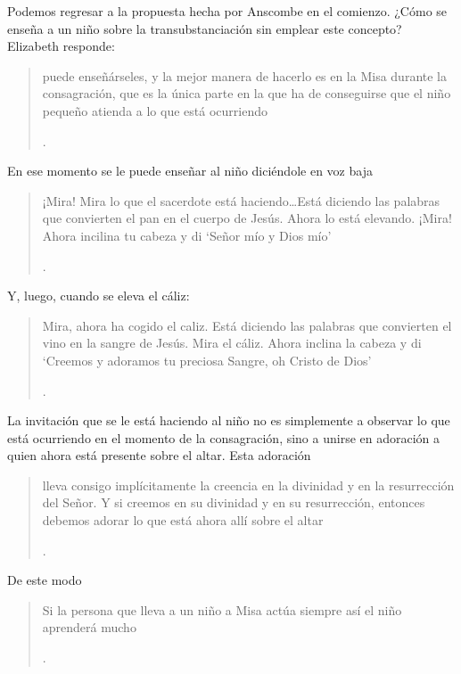 Podemos regresar a la propuesta hecha por Anscombe en el comienzo. ¿Cómo se enseña a un niño sobre la transubstanciación sin emplear este concepto? Elizabeth responde: \blockquote[{\Cite[85]{torralbaynubiola2005fayeh:ot}}.
]{puede enseñárseles, y la mejor manera de hacerlo es en la Misa durante la consagración, que es la única parte en la que ha de conseguirse que el niño pequeño atienda a lo que está ocurriendo}. En ese momento se le puede enseñar al niño diciéndole en voz baja \blockquote[{\Cite[85]{torralbaynubiola2005fayeh:ot}}.
]{¡Mira! Mira lo que el sacerdote está haciendo\ldots  Está diciendo las palabras que convierten el pan en el cuerpo de Jesús. Ahora lo está elevando. ¡Mira! Ahora incilina tu cabeza y di `Señor mío y Dios mío'}. Y, luego, cuando se eleva el cáliz: \blockquote[{\Cite[85]{torralbaynubiola2005fayeh:ot}}.
]{Mira, ahora ha cogido el caliz. Está diciendo las palabras que convierten el vino en la sangre de Jesús. Mira el cáliz. Ahora inclina la cabeza y di `Creemos y adoramos tu preciosa Sangre, oh Cristo de Dios'}.

La invitación que se le está haciendo al niño no es simplemente a observar lo que está ocurriendo en el momento de la consagración, sino a unirse en adoración a quien ahora está presente sobre el altar. Esta adoración \blockquote[{\Cite[86]{torralbaynubiola2005fayeh:ot}}.
]{lleva consigo implícitamente la creencia en la divinidad y en la resurrección del Señor. Y si creemos en su divinidad y en su resurrección, entonces debemos adorar lo que está ahora allí sobre el altar}. De este modo \blockquote[{\Cite[85]{torralbaynubiola2005fayeh:ot}}.
]{Si la persona que lleva a un niño a Misa actúa siempre así \textelp{} el niño aprenderá mucho}.

